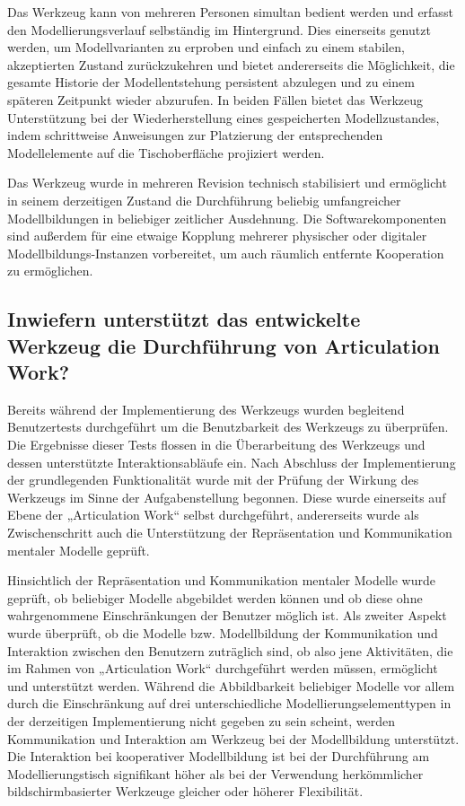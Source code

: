 Das Werkzeug kann von mehreren Personen simultan bedient werden und erfasst den Modellierungsverlauf selbständig im Hintergrund. Dies einerseits genutzt werden, um Modellvarianten zu erproben und einfach zu einem stabilen, akzeptierten Zustand zurückzukehren und bietet andererseits die Möglichkeit, die gesamte Historie der Modellentstehung persistent abzulegen und zu einem späteren Zeitpunkt wieder abzurufen. In beiden Fällen bietet das Werkzeug Unterstützung bei der Wiederherstellung eines gespeicherten Modellzustandes, indem schrittweise Anweisungen zur Platzierung der entsprechenden Modellelemente auf die Tischoberfläche projiziert werden.

Das Werkzeug wurde in mehreren Revision technisch stabilisiert und ermöglicht in seinem derzeitigen Zustand die Durchführung beliebig umfangreicher Modellbildungen in beliebiger zeitlicher Ausdehnung. Die Softwarekomponenten sind außerdem für eine etwaige Kopplung mehrerer physischer oder digitaler Modellbildungs-Instanzen vorbereitet, um auch räumlich entfernte Kooperation zu ermöglichen. 

\subsection{Inwiefern unterstützt das entwickelte Werkzeug die Durchführung von Articulation Work?}

Bereits während der Implementierung des Werkzeugs wurden begleitend Benutzertests durchgeführt um die Benutzbarkeit des Werkzeugs zu überprüfen. Die Ergebnisse dieser Tests flossen in die Überarbeitung des Werkzeugs und dessen unterstützte Interaktionsabläufe ein. Nach Abschluss der Implementierung der grundlegenden Funktionalität wurde mit der Prüfung der Wirkung des Werkzeugs im Sinne der Aufgabenstellung begonnen. Diese wurde einerseits auf Ebene der „Articulation Work“ selbst durchgeführt, andererseits wurde als Zwischenschritt auch die Unterstützung der Repräsentation und Kommunikation mentaler Modelle geprüft.

Hinsichtlich der Repräsentation und Kommunikation mentaler Modelle wurde geprüft, ob beliebiger Modelle abgebildet werden können und ob diese ohne wahrgenommene Einschränkungen der Benutzer möglich ist. Als zweiter Aspekt wurde überprüft, ob die Modelle bzw. Modellbildung der Kommunikation und Interaktion zwischen den Benutzern zuträglich sind, ob also jene Aktivitäten, die im Rahmen von „Articulation Work“ durchgeführt werden müssen, ermöglicht und unterstützt werden. Während die Abbildbarkeit beliebiger Modelle vor allem durch die Einschränkung auf drei unterschiedliche Modellierungselementtypen in der derzeitigen Implementierung nicht gegeben zu sein scheint, werden Kommunikation und Interaktion am Werkzeug bei der Modellbildung unterstützt. Die Interaktion bei kooperativer Modellbildung ist bei der Durchführung am Modellierungstisch signifikant höher als bei der Verwendung herkömmlicher bildschirmbasierter Werkzeuge gleicher oder höherer Flexibilität.

